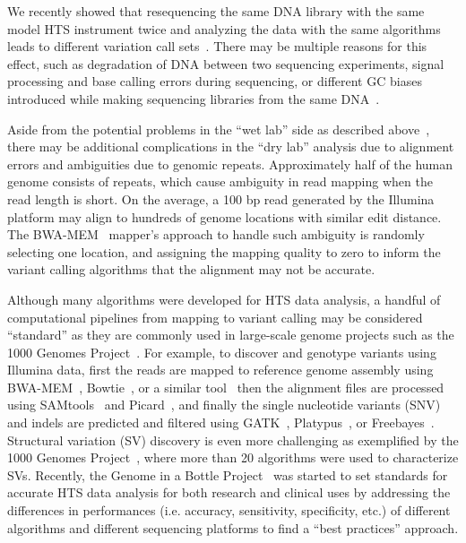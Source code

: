 \documentclass[10pt,a4paper]{article}
\begin{document}
We recently showed that resequencing the same DNA library 
with the same model HTS instrument twice and analyzing the data with the same algorithms leads to different variation call sets~\cite{Kavak2015}. There may be multiple reasons for this effect,
such as degradation of DNA between two sequencing experiments, signal processing and base calling errors during sequencing, or different GC biases introduced while making sequencing libraries from the
same DNA~\cite{Kavak2015}. 

Aside from the potential problems in the ``wet lab'' side as described above~\cite{Kavak2015}, 
there may be additional complications in the ``dry lab'' analysis due to alignment errors and ambiguities due to genomic repeats.
Approximately half of the human genome consists of repeats, which cause ambiguity in read mapping when the read length is short. On the average, a 100 bp read generated by the Illumina platform may align to hundreds of genome locations with similar edit distance. 
The BWA-MEM~\cite{Li2009a,Li2013} mapper's  approach to handle such ambiguity is randomly selecting one location, and assigning the mapping quality to zero to inform the variant calling algorithms that the alignment may not be accurate. 

Although many algorithms were developed for HTS data analysis, a handful of computational pipelines from mapping to variant calling may be considered ``standard'' as they are commonly used in large-scale genome projects such as the 1000 Genomes Project~\cite{1000GP,1000GP2012}. For example, to discover and genotype variants using Illumina data, first the reads are mapped to reference genome assembly using BWA-MEM~\cite{Li2009a,Li2013}, Bowtie~\cite{Langmead2009}, or a similar tool~\cite{Alkan2009,Weese2012} then the alignment files are processed using SAMtools~\cite{Li2009b} and Picard~\cite{picard}, and finally the single nucleotide variants (SNV) and indels are predicted and filtered using GATK~\cite{DePristo2011}, Platypus~\cite{Rimmer2014}, or Freebayes~\cite{Garrison2012}. 
Structural variation (SV) discovery is even more challenging as exemplified by the 1000 Genomes Project~\cite{1000GP,1000GP2012,Mills2011}, where more than 20 algorithms were used to characterize SVs.
Recently, the Genome in a Bottle Project~\cite{Zook2014} was started to set standards for accurate HTS data analysis for both research and clinical uses by addressing the differences in performances (i.e. accuracy, sensitivity, specificity, etc.) of different algorithms and different sequencing platforms
 to find a ``best practices'' approach.
\end{document}
